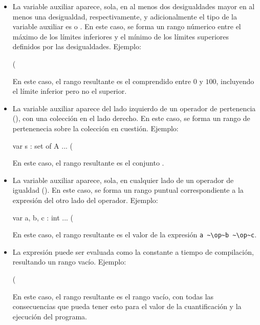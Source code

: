 \begin{itemize}

	\item La variable auxiliar aparece, sola, en al menos dos desigualdades
	mayor en al menos una desigualdad, respectivamente, y adicionalmente el tipo
	de la variable auxiliar es  o . En este caso, se
	forma un rango númerico entre el máximo de los límites inferiores y el mínimo
	de los límites superiores definidos por las desigualdades. Ejemplo:

\begin{gracielacode}
(%
\end{gracielacode}

	En este caso, el rango resultante es el comprendido entre $0$ y $100$,
	incluyendo  el límite inferior pero no el superior.\\

	\item La variable auxiliar aparece del lado izquierdo de un operador de
	pertenencia (\Elem), con una colección en el lado derecho. En este caso, se
	forma un rango de pertenenecia sobre la colección en cuestión. Ejemplo:

\begin{gracielacode}
var s : set of A
...
(%
\end{gracielacode}

	En este caso, el rango resultante es el conjunto .\\

	\item La variable auxiliar aparece, sola, en cualquier lado de un operador de
	igualdad (\ingra{==}). En este caso, se forma un rango puntual
	correspondiente a la expresión del otro lado del operador. Ejemplo:

\begin{gracielacode}
var a, b, c : int
...
(%
\end{gracielacode}

	En este caso, el rango resultante es el valor de la expresión
	\lstinline[language=graciela]{a ~\op~b ~\op~c}.\\

	\item La expresión puede ser evaluada como la constante  a
	tiempo de compilación, resultando un rango vacío. Ejemplo:

\begin{gracielacode}
(%
\end{gracielacode}

	En este caso, el rango resultante es el rango vacío, con todas las
	consecuencias que pueda tener esto para el valor de la cuantificación y la
	ejecución del programa.

\end{itemize}


